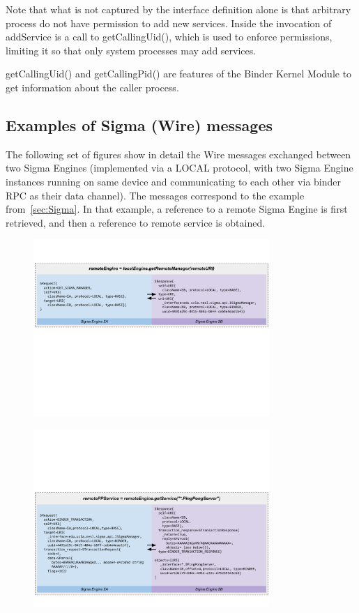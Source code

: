 \documentclass[prodmode]{acmlarge}
\begin{document}
Note that what is not captured by the interface definition alone is that arbitrary process do not have permission to add new services. Inside the invocation of addService is a call to getCallingUid(), which is used to enforce permissions, limiting it so that only system processes may add services.

getCallingUid() and getCallingPid() are features of the Binder Kernel Module to get information about the caller process.

\pagebreak[4]
\subsection{Examples of Sigma (Wire) messages}
\label{app:WireExchange}
The following set of figures show in detail the Wire messages exchanged between two Sigma Engines (implemented via a LOCAL protocol, with two Sigma Engine instances running on same device and communicating to each other via binder RPC as their data channel). The messages correspond to the example from~\ref{sec:Sigma}. In that example, a reference to a remote Sigma Engine is first retrieved, and then a reference to remote service is obtained.

\begin{figure}[h!]
\centering
\includegraphics[width=0.8\textwidth]{drawings/WireExchange1.pdf}
\end{figure}

\begin{figure}[h!]
\centering
\includegraphics[width=0.8\textwidth]{drawings/WireExchange2.pdf}
\end{figure}
\end{document}
